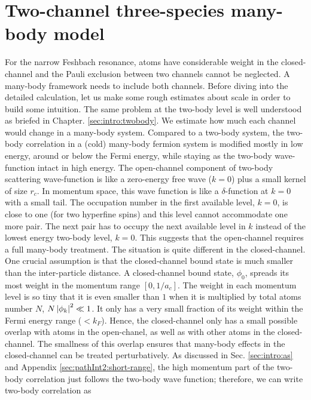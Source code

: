 
\chapter{Two-channel three-species many-body model\label{ch:path2}}


For the narrow Feshbach resonance, atoms have considerable weight in the closed-channel and the Pauli exclusion between two channels cannot be neglected.  A many-body framework needs to include both channels.  Before diving into the detailed calculation, let us make some rough estimates about scale in order to  build some intuition.  The same problem at the two-body level is well understood as briefed in Chapter. \ref{sec:intro:twobody}.  %
We estimate how much each channel would change  in a many-body system.  Compared to a two-body system, the two-body correlation in a (cold) many-body fermion system is modified mostly in  low  energy,  around or below the Fermi energy, while staying  as  the two-body wave-function intact in high energy.  The open-channel component  of two-body scattering wave-function is like a zero-energy free wave ($k=0$) plus a small kernel of size $r_c$.  In momentum space, this wave function is like a $\delta$-function at $k=0$ with a small tail.  The occupation number in the first available level, $k=0$, is close to one (for two hyperfine spins) and this level cannot accommodate one more pair.  The next pair has to occupy the next available level in $k$ instead of the lowest energy two-body level, $k=0$.  This suggests that the open-channel requires a full many-body treatment.  The situation is quite different in the closed-channel.   One crucial assumption is that  the closed-channel bound state is much smaller than the inter-particle distance. A closed-channel bound state,  $\phi_{0}$, spreads its most weight  in the  momentum range $[0,1/a_{c}]$.  The weight in each momentum level is so tiny that it is even smaller than $1$ when it is multiplied by total atoms number $N$, $N\left\lvert{\phi_{k}}\right\rvert^{2}\ll1$.             It only has a very small fraction of its weight within the Fermi energy range ($<k_{F}$).  Hence, the closed-channel only has a small possible overlap with atoms in  the open-chanel, as well as with other atoms in the closed-channel.  The smallness of this overlap ensures that many-body effects in the closed-channel can be  treated perturbatively.  As discussed in Sec. \ref{sec:intro:as} and Appendix \ref{sec:pathInt2:short-range}, the high momentum part of the two-body correlation just follows the two-body wave function;  therefore, we can write two-body correlation as 
